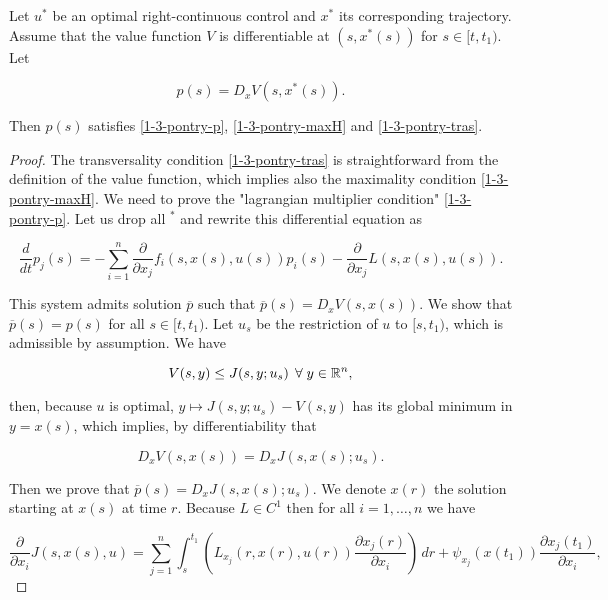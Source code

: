 \begin{theorem}\label{1-3-pontrydyn}
    Let $u^{\ast}$ be an optimal right-continuous control and $x^{\ast}$ its corresponding trajectory. 
    Assume that the value function $V$ is differentiable at $(s,x^{\ast}(s))$ for $s\in[t,t_1)$. Let

    \begin{equation}\label{1-3-pontrydyn-defP}
        p(s) = D_x V(s,x^{\ast}(s)). 
    \end{equation}

    Then $p(s)$ satisfies \eqref{1-3-pontry-p}, \eqref{1-3-pontry-maxH} and \eqref{1-3-pontry-tras}.

    \begin{proof}
        The transversality condition \eqref{1-3-pontry-tras} is straightforward from the definition of the  
        value function, which implies also the maximality condition \eqref{1-3-pontry-maxH}. 
        We need to prove the "lagrangian multiplier condition" \eqref{1-3-pontry-p}. 
        Let us drop all $^{\ast}$ and rewrite this differential equation as

        \begin{equation}\label{1-3-pontrydyn-rewritecond}
            \frac{d}{dt} p_j(s) = - \sum_{i=1}^n \frac{\partial}{\partial x_j}f_i(s,x(s),u(s))p_i(s) - \frac{\partial}{\partial x_j}L(s,x(s),u(s)).
        \end{equation}

        This system admits solution $\overline{p}$ such that $\overline{p}(s)=D_xV(s,x(s))$. We show that $\overline{p}(s)=p(s)$ for all $s\in[t,t_1)$. Let $u_s$ be 
        the restriction of $u$ to $[s,t_1)$, which is admissible by assumption. We have

        \[V(s,y) \leq J(s,y;u_s) \,\forall y\in\R^n,\]

        then, because $u$ is optimal, $y\mapsto J(s,y;u_s) - V(s,y)$ has its global minimum in $y=x(s)$, which implies, by differentiability that

        \begin{equation}\label{1-3-pontrydyn-derconV}
            D_x V(s,x(s)) = D_x J(s,x(s);u_s).
        \end{equation}

        Then we prove that $\overline{p}(s) = D_x J(s,x(s);u_s)$. We denote $x(r)$ the solution starting at $x(s)$ at time $r$. Because $L\in C^1$ then for all $i=1,\dots,n$ we have

        \begin{equation*}
            \frac{\partial}{\partial x_i}J(s,x(s),u) = \sum_{j=1}^n \int_s^{t_1} \left(L_{x_j}(r,x(r),u(r))\frac{\partial x_j(r)}{\partial x_i}\right) \,dr + \psi_{x_j}(x(t_1))\frac{\partial x_j(t_1)}{\partial x_i},
        \end{equation*} 


\end{proof}
\end{theorem}
